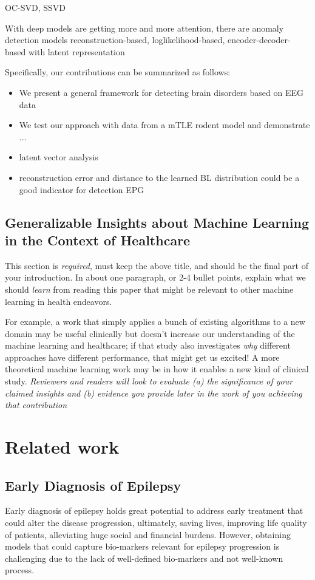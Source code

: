 \documentclass[pmlr]{jmlr}%
\begin{document}
OC-SVD, SSVD


With deep models are getting more and more attention, there are anomaly detection models 
reconstruction-based,
loglikelihood-based,
encoder-decoder-based with latent representation


Specifically, our contributions can be summarized as follows:
\begin{itemize}
	\item We present a general framework for detecting brain disorders based on EEG data
	\item We test our approach with data from a mTLE rodent model and demonstrate ... 
	\item latent vector analysis 
	\item reconstruction error and distance to the learned BL distribution could be a good indicator for detection EPG
\end{itemize}


\subsection*{Generalizable Insights about Machine Learning in the Context of Healthcare}
This section is \emph{required}, must keep the above title, and should
be the final part of your introduction.  In about one paragraph, or
2-4 bullet points, explain what we should \emph{learn} from reading
this paper that might be relevant to other machine learning in health
endeavors.

For example, a work that simply applies a bunch of existing algorithms
to a new domain may be useful clinically but doesn't increase our
understanding of the machine learning and healthcare; if that study
also investigates \emph{why} different approaches have different
performance, that might get us excited!  A more theoretical machine
learning work may be in how it enables a new kind of clinical study.
\emph{Reviewers and readers will look to evaluate (a) the significance
	of your claimed insights and (b) evidence you provide later in the
	work of you achieving that contribution}


\section{Related work}
\subsection{Early Diagnosis of Epilepsy}
Early diagnosis of epilepsy holds great potential to address early treatment that could alter the disease progression, ultimately, saving lives, improving life quality of patients, alleviating huge social and financial burdens. However, obtaining models that could capture bio-markers relevant for epilepsy progression is challenging due to the lack of well-defined bio-markers and not well-known process. 
\end{document}
